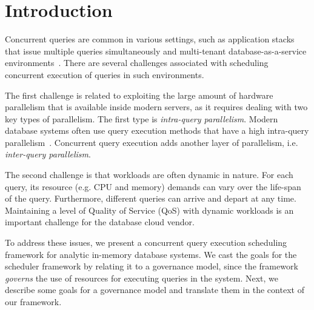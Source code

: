 \section{Introduction}\label{sec:intro}
Concurrent queries are common in various settings, such as application stacks that issue multiple queries simultaneously and multi-tenant database-as-a-service environments~\cite{NarasayyaMSLSC15, NarasayyaDSCC13}.
There are several challenges associated with scheduling  concurrent execution of queries in such environments.

The first challenge is related to exploiting the large amount of hardware parallelism that is available inside modern servers, as it requires dealing with two key types of parallelism.
The first type is \textit{intra-query parallelism}. 
Modern database systems often use query execution methods that have a high intra-query parallelism~\cite{qsstorage,morsel,wang2016elastic}.
Concurrent query execution adds another layer of parallelism, i.e. \textit{inter-query parallelism}. 

The second challenge is that workloads are often dynamic in nature. 
For each query, its resource (e.g. CPU and memory) demands can vary over the life-span of the query. 
Furthermore, different queries can arrive and depart at any time. %
Maintaining a  level of Quality of Service (QoS) with dynamic workloads is an important challenge for the database cloud vendor. 


To address these issues, we present a concurrent query execution scheduling framework for analytic in-memory database systems. 
We cast the goals for the scheduler framework by relating it to a governance model, since
the framework \textit{governs} the use of resources for executing queries in the system. 
Next, we describe some goals for a governance model and translate them in the context of our framework.  

